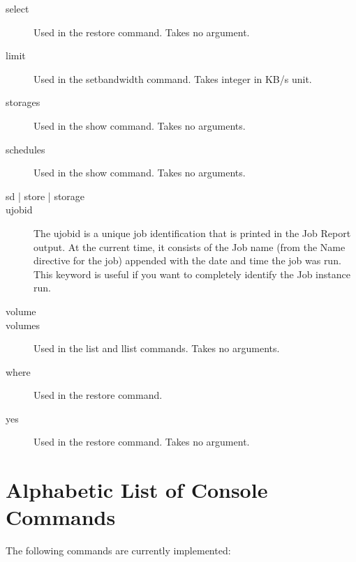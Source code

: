 \begin{description}
\item [select]
  Used in the restore command. Takes no argument.
\item[limit]
  Used in the setbandwidth command. Takes integer in KB/s unit.
\item [storages]
  Used in the show command. Takes no arguments.
\item [schedules]
  Used in the show command. Takes no arguments.
\item [sd | store | storage]
\item [ujobid]
  The ujobid is a unique job identification that is printed
  in the Job Report output. At the current time, it consists
  of the Job name (from the Name directive for the job) appended
  with the date and time the job was run. This keyword is useful
  if you want to completely identify the Job instance run.
\item [volume]
\item [volumes]
  Used in the list and llist commands. Takes no arguments.
\item [where]
  Used in the restore command.
\item [yes]
  Used in the restore command. Takes no argument.
\end{description}

\label{list}
\section{Alphabetic List of Console Commands}

The following commands are currently implemented:

